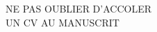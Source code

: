 \newpage
\vspace*{\fill}
\centering
{\Huge NE PAS OUBLIER D'ACCOLER \\[1ex] UN CV AU MANUSCRIT}
\vspace*{\fill}

{}
{}
